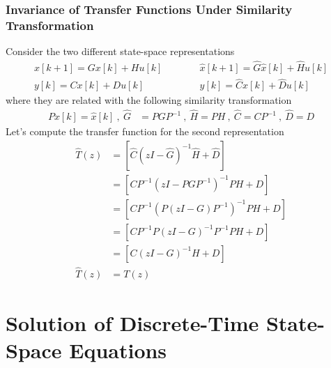 \documentclass[twoside]{article}
\begin{document}
\subsubsection*{Invariance of Transfer Functions Under Similarity
  Transformation}

Consider the two different state-space representations
%
\begin{align*}
  x[k+1] = G x[k] + H u[k]  \quad & \quad \quad \hat{x}[k+1] = \hat{G} \hat{x}[k] + \hat{H} u[k] 
\\
  y[k] = C x[k] + D u[k] \quad & \quad \quad  y[k] = \hat{C} x[k] + \hat{D} u[k]
\end{align*}
%
where they are related with the following similarity transformation
%
\begin{align*}
P x[k] = \hat{x}[k] \ , \
\hat{G} &= P  G P^{-1} \ , \ \hat{H} = P  H \ , \ \hat{C} = C P^{-1} \ ,
  \ \hat{D} = D
\end{align*}
%
Let's compute the transfer function for the second representation
%
\begin{align*}
  \hat{T}(z) &= \left[ \hat{C} \left(z I - \hat{G} \right)^{-1} \hat{H}
  + \hat{D} \right]
\\
&= \left[ C P^{-1} \left(z I - P  G P^{-1} \right)^{-1} P H
  + D \right]
\\
&= \left[ C P^{-1} \left( P \left( z I -   G \right) P^{-1} \right)^{-1} P H
  + D \right]
\\
&= \left[ C P^{-1} P \left( z I -   G \right)^{-1} P^{-1} P H
  + D \right]
\\
&= \left[ C \left( z I -   G \right)^{-1} H + D \right]
\\
\hat{T}(z) &= T(z)
\end{align*}

\newpage

\section*{Solution of Discrete-Time State-Space Equations}
\end{document}
